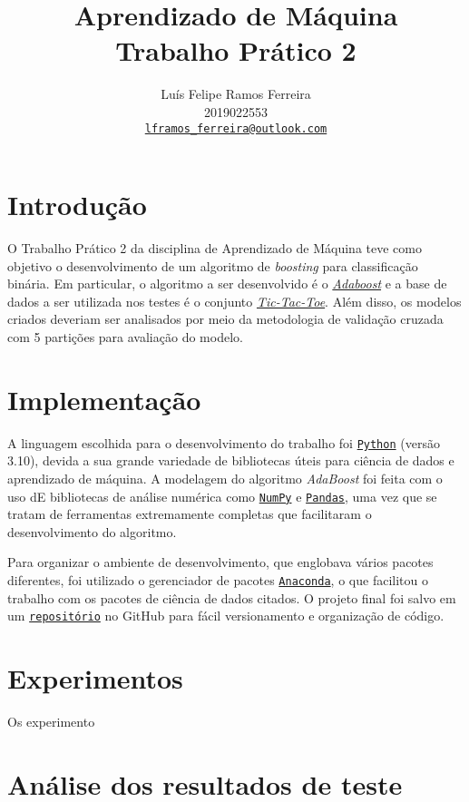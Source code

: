 \documentclass{article}
\title{Aprendizado de Máquina \\ Trabalho Prático 2}
\author{Luís Felipe Ramos Ferreira \\ 2019022553 \\
    \href{mailto:lframos_ferreira@outlook.com}{\texttt{lframos\_ferreira@outlook.com}}}
\begin{document}
\maketitle

\section{Introdução}

O Trabalho Prático 2 da disciplina de Aprendizado de Máquina teve como objetivo o desenvolvimento de um algoritmo de \textit{boosting}
para classificação binária. Em particular, o algoritmo a ser desenvolvido é o \href{https://en.wikipedia.org/wiki/AdaBoost}{\textit{Adaboost}} e a base de dados a ser
utilizada nos testes é o conjunto \href{https://archive.ics.uci.edu/ml/datasets/Tic-Tac-Toe+Endgame}{\textit{Tic-Tac-Toe}}. Além disso, os modelos criados deveriam
ser analisados por meio da metodologia de validação cruzada com 5 partições para avaliação do modelo.

\section{Implementação}

A linguagem escolhida para o desenvolvimento do trabalho foi \href{https://www.python.org/}{\texttt{Python}} (versão 3.10), devida a sua grande variedade de bibliotecas úteis para ciência de dados e aprendizado de máquina.
 A modelagem do algoritmo \textit{AdaBoost} foi feita com o uso dE bibliotecas de análise numérica como \href{https://numpy.org/}{\texttt{NumPy}} e \href{https://pandas.pydata.org/}{\texttt{Pandas}}, 
 uma vez que se tratam de ferramentas extremamente completas que facilitaram o desenvolvimento do algoritmo.

Para organizar o ambiente de desenvolvimento, que englobava vários pacotes diferentes, foi utilizado o gerenciador de pacotes \href{https://www.anaconda.com/}{\texttt{Anaconda}}, o que facilitou o trabalho
com os pacotes de ciência de dados citados. O projeto final foi salvo em um \href{https://github.com/lframosferreira/boosting-process}{\texttt{repositório}} no GitHub para fácil versionamento e organização de código.

\section{Experimentos}

Os experimento

\section{Análise dos resultados de teste}
\end{document}
